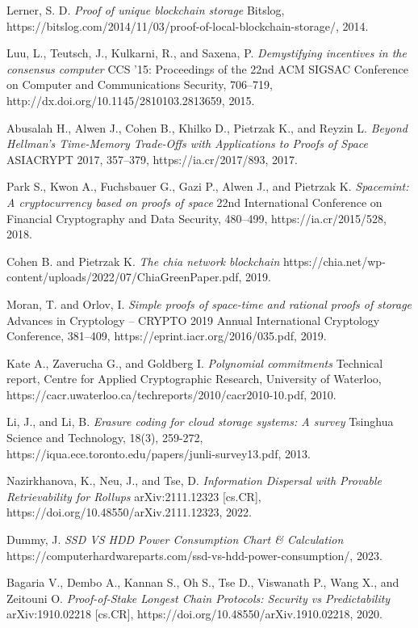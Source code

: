 \documentclass[conference]{IEEEtran}
\begin{document}
\begin{thebibliography}{}
Lerner, S. D. \emph{Proof of unique blockchain storage} Bitslog, https://bitslog.com/2014/11/03/proof-of-local-blockchain-storage/, 2014.

Luu, L., Teutsch, J., Kulkarni, R., and Saxena, P. \emph{Demystifying incentives in the consensus computer} CCS '15: Proceedings of the 22nd ACM SIGSAC Conference on Computer and Communications Security, 706–719, http://dx.doi.org/10.1145/2810103.2813659, 2015.
 
Abusalah H., Alwen J., Cohen B., Khilko D., Pietrzak K., and Reyzin L.
\emph{Beyond Hellman’s Time-Memory Trade-Offs with Applications to Proofs of Space} ASIACRYPT 2017, 357–379, https://ia.cr/2017/893, 2017.

Park S., Kwon A., Fuchsbauer G., Gazi P., Alwen J., and Pietrzak K. \emph{Spacemint: A cryptocurrency based on proofs of space} 22nd International Conference on Financial Cryptography and Data Security, 480–499, https://ia.cr/2015/528, 2018.

Cohen B. and Pietrzak K. \emph{The chia network blockchain} https://chia.net/wp-content/uploads/2022/07/ChiaGreenPaper.pdf, 2019.

Moran, T. and Orlov, I. \emph{Simple proofs of space-time and rational proofs of storage} Advances in Cryptology – CRYPTO 2019 Annual International Cryptology Conference, 381–409, https://eprint.iacr.org/2016/035.pdf, 2019.

Kate A., Zaverucha G., and Goldberg I. \emph{Polynomial commitments} Technical report, Centre for Applied Cryptographic Research, University of Waterloo, https://cacr.uwaterloo.ca/techreports/2010/cacr2010-10.pdf, 2010.

Li, J., and Li, B. \emph{Erasure coding for cloud storage systems: A survey} Tsinghua Science and Technology, 18(3), 259-272, https://iqua.ece.toronto.edu/papers/junli-survey13.pdf, 2013.

Nazirkhanova, K., Neu, J., and Tse, D. \emph{Information Dispersal with Provable Retrievability for Rollups} arXiv:2111.12323 [cs.CR], https://doi.org/10.48550/arXiv.2111.12323, 2022.

Dummy, J. \emph{SSD VS HDD Power Consumption Chart \& Calculation} https://computerhardwareparts.com/ssd-vs-hdd-power-consumption/, 2023.

Bagaria V., Dembo A., Kannan S., Oh S., Tse D., Viswanath P., Wang X., and Zeitouni O. \emph{Proof-of-Stake Longest Chain Protocols: Security vs Predictability} arXiv:1910.02218 [cs.CR], https://doi.org/10.48550/arXiv.1910.02218, 2020.


\end{thebibliography}
\end{document}
